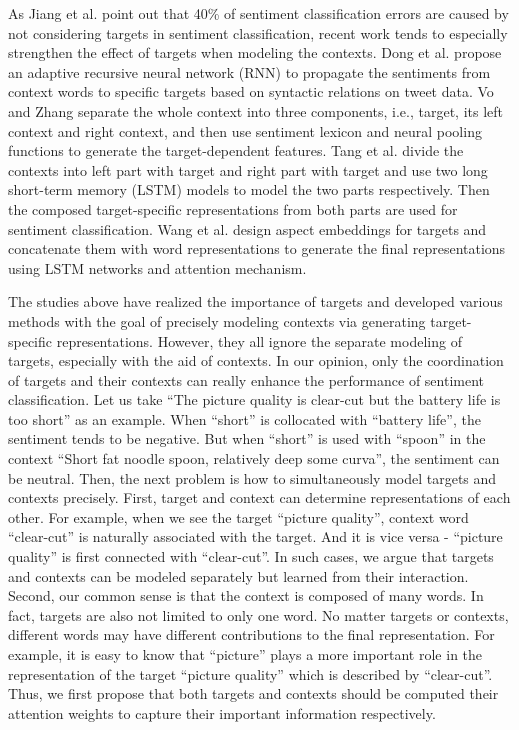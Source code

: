 \documentclass{article}
\begin{document}
As Jiang et al.  point out that 40\% of sentiment classification errors are caused by not considering
targets in sentiment classification, recent work tends to especially strengthen the effect of targets when modeling the contexts.
Dong et al.   propose an adaptive recursive neural network (RNN) to propagate the sentiments  from context  words to specific targets based on syntactic relations on tweet data. 
Vo and Zhang   separate the whole context into three components, i.e., target, its left context and right context, and then use sentiment lexicon and neural pooling functions to generate the target-dependent features.
Tang et al.  divide the contexts into  left part with target and right part with target and use two long short-term memory (LSTM) models to model the two parts respectively. 
Then the composed target-specific representations from both parts are used for sentiment classification.
Wang et al.   design aspect embeddings for targets and concatenate  them with word representations to generate the final representations using LSTM networks and attention mechanism.

The  studies above have realized the importance of targets and developed various methods with the goal of precisely modeling contexts via generating  target-specific representations.
However, they all ignore the separate modeling of targets, especially with the aid of contexts.
In our opinion, only the coordination of targets and their contexts can really enhance the performance of sentiment classification.
Let us take ``The picture quality is clear-cut but the battery life is too short'' as an example.
When ``short'' is collocated with ``battery life'', the sentiment tends to be negative.
But  when  ``short'' is used with ``spoon'' in  the context  ``Short fat noodle spoon, relatively deep some curva'',  the sentiment can be neutral.
Then, the next problem is how to simultaneously model targets and contexts precisely.
First,  target and context can  determine representations of each other.
For example, when we see the target  ``picture quality'',  context word ``clear-cut'' is naturally associated with the target.
And it is vice versa - ``picture quality'' is first connected with  ``clear-cut''.
In such cases, we argue that targets and contexts can be modeled separately but learned from their interaction. 
Second, our common sense is that the context is composed of many words. In fact, targets are also not limited to only one word.
No matter targets or contexts, different words may have different contributions to the final representation.
For example, it is easy to know that ``picture'' plays a more important role in the representation of the  target ``picture quality'' which is described by ``clear-cut''.
Thus,  we first propose that  both targets and contexts should be computed their attention weights to capture their important information respectively.
\end{document}
